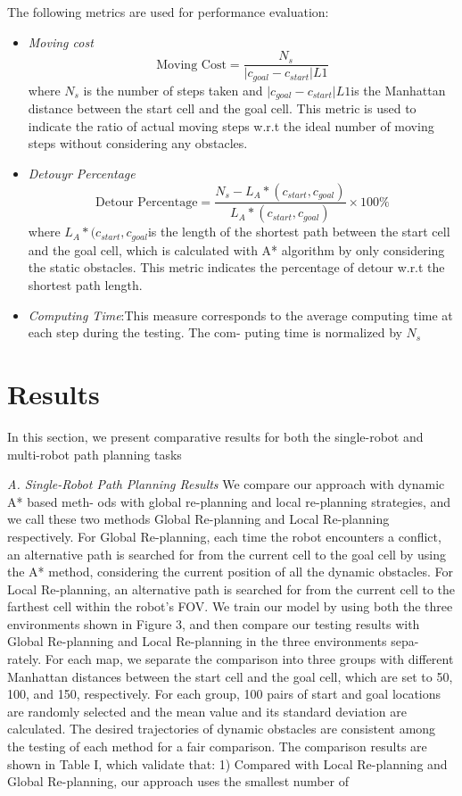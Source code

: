 \documentclass[10pt,twocolumn,letterpaper]{article}
\begin{document}
The following metrics are used for performance evaluation:
\begin{itemize}
    \item \textit{Moving cost}
    \begin{equation}
        \text{Moving Cost} = \frac{N_{s}}{\lvert c_{goal} - c_{start}\rvert L1}
    \end{equation}
    where $N_{s}$ is the number of steps taken and $\lvert c_{goal} - c_{start}\rvert L1$is the Manhattan distance between the start cell and the
    goal cell. This metric is used to indicate the ratio of actual
    moving steps w.r.t the ideal number of moving steps without
    considering any obstacles.
    \item \textit{Detouyr Percentage}
    \begin{equation}
        \text{Detour Percentage} = \frac{N_{s}-L_{A}*(c_{start},c_{goal})}{L_{A}*(c_{start},c_{goal})} \times 100\%
    \end{equation}
    where $L_{A}*(c_{start},c_{goal}$is the length of the shortest path
    between the start cell and the goal cell, which is calculated
    with A* algorithm by only considering the static obstacles.
    This metric indicates the percentage of detour w.r.t the
    shortest path length.
    \item \textit{Computing Time}:This measure corresponds to the average
    computing time at each step during the testing. The com-
    puting time is normalized by $N_{s}$
\end{itemize}

\section{Results}
In this section, we present comparative results for both the
single-robot and multi-robot path planning tasks

\textit{A. Single-Robot Path Planning Results}
We compare our approach with dynamic A* based meth-
ods with global re-planning and local re-planning strategies,
and we call these two methods Global Re-planning
and Local Re-planning respectively. For Global
Re-planning, each time the robot encounters a conflict, an
alternative path is searched for from the current cell to the goal
cell by using the A* method, considering the current position
of all the dynamic obstacles. For Local Re-planning,
an alternative path is searched for from the current cell to the
farthest cell within the robot’s FOV. We train our model by
using both the three environments shown in Figure 3, and then
compare our testing results with Global Re-planning
and Local Re-planning in the three environments sepa-
rately. For each map, we separate the comparison into three
groups with different Manhattan distances between the start
cell and the goal cell, which are set to 50, 100, and 150,
respectively. For each group, 100 pairs of start and goal
locations are randomly selected and the mean value and its
standard deviation are calculated. The desired trajectories of
dynamic obstacles are consistent among the testing of each
method for a fair comparison.
The comparison results are shown in Table I, which validate
that: 1) Compared with Local Re-planning and Global
Re-planning, our approach uses the smallest number of
\end{document}
